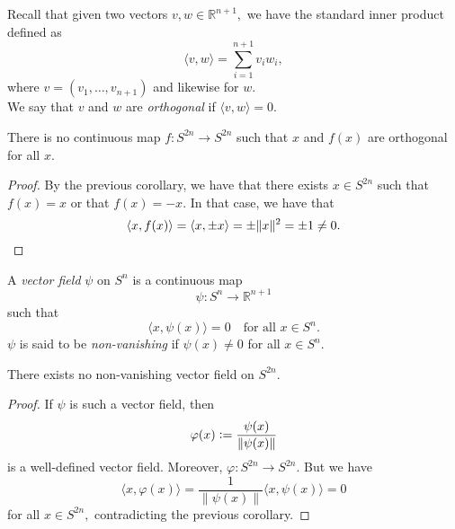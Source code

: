 \documentclass[12pt]{article}
\begin{document}
\begin{defn}
	Recall that given two vectors $v, w \in \mathbb{R}^{n+1},$ we have the standard inner product defined as
	\begin{equation*} 
		\langle v, w\rangle = \sum_{i = 1}^{n + 1}v_iw_i,
	\end{equation*}
	where $v = (v_1, \ldots, v_{n+1})$ and likewise for $w.$\\
	We say that $v$ and $w$ are \emph{orthogonal} if $\langle v, w\rangle = 0.$
\end{defn}

\begin{cor}
	There is no continuous map $f:S^{2n}\to S^{2n}$ such that $x$ and $f(x)$ are orthogonal for all $x.$
\end{cor}
\begin{proof} 
	By the previous corollary, we have that there exists $x \in S^{2n}$ such that $f(x) = x$ or that $f(x) = -x.$ In that case, we have that
	\begin{equation*} 
		\langle x, f(x)\rangle = \langle x, \pm x\rangle = \pm \|x\|^2 = \pm 1 \neq 0. \qedhere
	\end{equation*}
\end{proof}

\begin{defn}
	A \emph{vector field} $\psi$ on $S^n$ is a continuous map
	\begin{equation*} 
		\psi:S^n \to \mathbb{R}^{n+1}
	\end{equation*}
	such that
	\begin{equation*} 
		\langle x, \psi(x)\rangle = 0 \quad \text{for all } x \in S^n.
	\end{equation*}
	$\psi$ is said to be \emph{non-vanishing} if $\psi(x) \neq 0$ for all $x \in S^n.$
\end{defn}

\begin{cor}
	There exists no non-vanishing vector field on $S^{2n}.$
\end{cor}
\begin{proof} 
	If $\psi$ is such a vector field, then 
	\begin{equation*} 
		\varphi(x) \vcentcolon= \dfrac{\psi(x)}{\|\psi(x)\|}
	\end{equation*}
	is a well-defined vector field. Moreover, $\varphi:S^{2n} \to S^{2n}.$ But we have
	\begin{equation*} 
		\langle x, \varphi(x)\rangle = \dfrac{1}{\|\psi(x)\|}\langle x, \psi(x)\rangle = 0
	\end{equation*}
	for all $x \in S^{2n},$ contradicting the previous corollary.
\end{proof}
\end{document}
